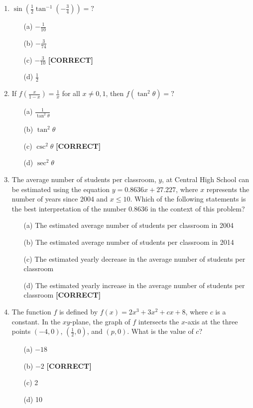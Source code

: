 \documentclass[12pt]{article}
\begin{document}
\begin{enumerate}
\item $\sin\left(\frac{1}{2}\tan^{-1}\left(-\frac{3}{4}\right)\right) = ?$
\begin{enumerate}
    \item[(a)] $-\frac{1}{10}$
    \item[(b)] $-\frac{3}{74}$
    \item[(c)] $-\frac{3}{10}$ \quad \textbf{[CORRECT]}
    \item[(d)] $\frac{1}{2}$
\end{enumerate}

\item If $f\left(\frac{x}{1-x}\right) = \frac{1}{x}$ for all $x \neq 0, 1$, then $f(\tan^2\theta) = ?$
\begin{enumerate}
    \item[(a)] $\frac{1}{\tan^2\theta}$
    \item[(b)] $\tan^2\theta$
    \item[(c)] $\csc^2\theta$ \quad \textbf{[CORRECT]}
    \item[(d)] $\sec^2\theta$
\end{enumerate}

\item The average number of students per classroom, $y$, at Central High School can be estimated using the equation $y = 0.8636x + 27.227$, where $x$ represents the number of years since 2004 and $x \leq 10$. Which of the following statements is the best interpretation of the number 0.8636 in the context of this problem?
\begin{enumerate}
    \item[(a)] The estimated average number of students per classroom in 2004
    \item[(b)] The estimated average number of students per classroom in 2014
    \item[(c)] The estimated yearly decrease in the average number of students per classroom
    \item[(d)] The estimated yearly increase in the average number of students per classroom \quad \textbf{[CORRECT]}
\end{enumerate}

\item The function $f$ is defined by $f(x) = 2x^3 + 3x^2 + cx + 8$, where $c$ is a constant. In the $xy$-plane, the graph of $f$ intersects the $x$-axis at the three points $(-4, 0)$, $\left(\frac{1}{2}, 0\right)$, and $(p, 0)$. What is the value of $c$?
\begin{enumerate}
    \item[(a)] $-18$
    \item[(b)] $-2$ \quad \textbf{[CORRECT]}
    \item[(c)] 2
    \item[(d)] 10
\end{enumerate}


\end{enumerate}
\end{document}
